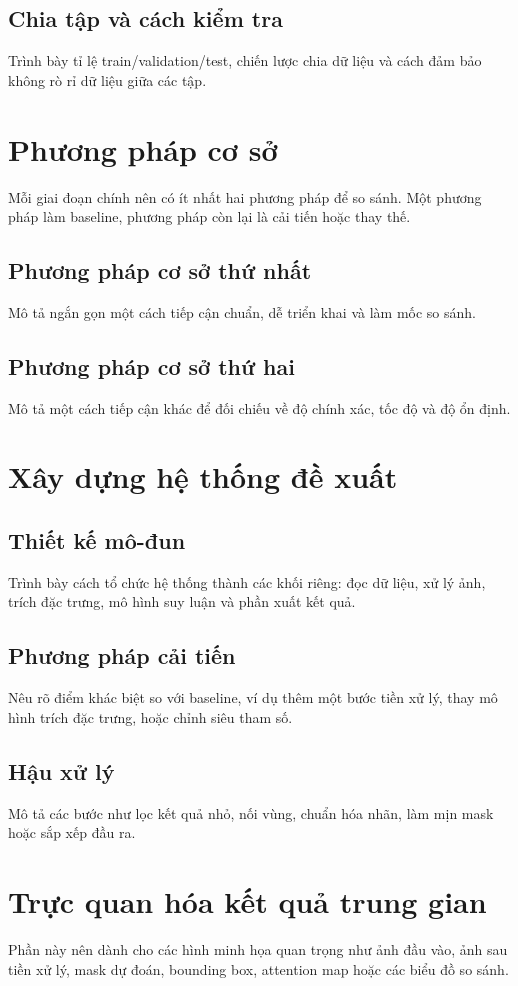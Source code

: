 \subsection{Chia tập và cách kiểm tra}
Trình bày tỉ lệ train/validation/test, chiến lược chia dữ liệu và cách đảm bảo không rò rỉ dữ liệu giữa các tập.

\section{Phương pháp cơ sở}
Mỗi giai đoạn chính nên có ít nhất hai phương pháp để so sánh. Một phương pháp làm baseline, phương pháp còn lại là cải tiến hoặc thay thế.

\subsection{Phương pháp cơ sở thứ nhất}
Mô tả ngắn gọn một cách tiếp cận chuẩn, dễ triển khai và làm mốc so sánh.

\subsection{Phương pháp cơ sở thứ hai}
Mô tả một cách tiếp cận khác để đối chiếu về độ chính xác, tốc độ và độ ổn định.

\section{Xây dựng hệ thống đề xuất}
\subsection{Thiết kế mô-đun}
Trình bày cách tổ chức hệ thống thành các khối riêng: đọc dữ liệu, xử lý ảnh, trích đặc trưng, mô hình suy luận và phần xuất kết quả.

\subsection{Phương pháp cải tiến}
Nêu rõ điểm khác biệt so với baseline, ví dụ thêm một bước tiền xử lý, thay mô hình trích đặc trưng, hoặc chỉnh siêu tham số.

\subsection{Hậu xử lý}
Mô tả các bước như lọc kết quả nhỏ, nối vùng, chuẩn hóa nhãn, làm mịn mask hoặc sắp xếp đầu ra.

\section{Trực quan hóa kết quả trung gian}
Phần này nên dành cho các hình minh họa quan trọng như ảnh đầu vào, ảnh sau tiền xử lý, mask dự đoán, bounding box, attention map hoặc các biểu đồ so sánh.

